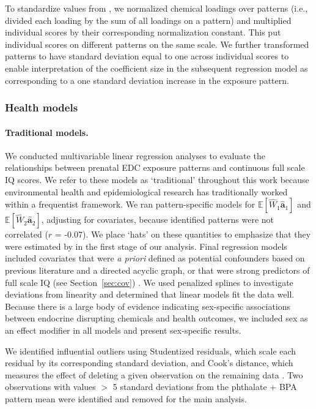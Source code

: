 To standardize values from \bnmfc, we normalized chemical loadings over patterns (i.e., divided each loading by the sum of all loadings on a pattern) and multiplied individual scores by their corresponding normalization constant. This put individual scores on different patterns on the same scale. We further transformed patterns to have standard deviation equal to one across individual scores to enable interpretation of the coefficient size in the subsequent regression model as corresponding to a one standard deviation increase in the exposure pattern.

\subsubsection{Health models}
\label{sec.health}
\paragraph{Traditional models.} We conducted multivariable linear regression analyses to evaluate the relationships between prenatal EDC exposure patterns and continuous full scale IQ scores. We refer to these models as `traditional' throughout this work because environmental health and epidemiological research has traditionally worked within a frequentist framework. We ran pattern-specific models for $\mathbb{E}[\widehat{W}_1\widehat{\mathbf{a}}_1]$ and $\mathbb{E}[\widehat{W}_2\widehat{\mathbf{a}}_2]$, adjusting for covariates, because identified patterns were not correlated ($r$ = -0.07). We place `hats' on these quantities to emphasize that they were estimated by \bnmf in the first stage of our analysis. Final regression models included covariates that were \textit{a priori} defined as potential confounders based on previous literature and a directed acyclic graph, or that were strong predictors of full scale IQ (see Section~\ref{sec:cov}) \cite{pearl2009causality, hernan2010causal}. We used penalized splines to investigate deviations from linearity and determined that linear models fit the data well. Because there is a large body of evidence indicating sex-specific associations between endocrine disrupting chemicals and health outcomes, we included sex as an effect modifier in all models and present sex-specific results.

We identified influential outliers using Studentized residuals, which scale each residual by its corresponding standard deviation, and Cook's distance, which measures the effect of deleting a given observation on the remaining data \cite{kleinbaum2013applied}. Two observations with values $>$ 5 standard deviations from  the phthalate + BPA pattern mean were identified and removed for the main analysis.

